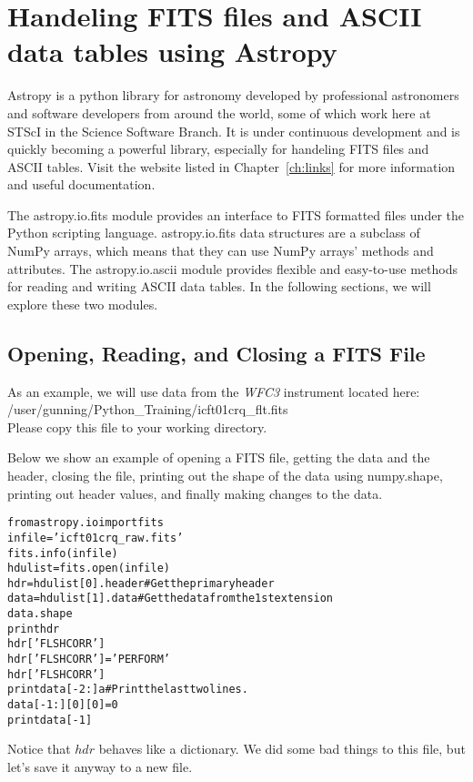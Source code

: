 \chapter{Handeling FITS files and ASCII data tables using Astropy}
\label{ch:fits}
Astropy is a python library for astronomy developed by professional astronomers
and software developers from around the world, some of which work here at STScI
in the Science Software Branch.  It is under continuous development and is quickly
becoming a powerful library, especially for handeling FITS files and ASCII tables.
Visit the website listed in Chapter~\ref{ch:links} for more information and useful
documentation.

The astropy.io.fits module provides an interface to FITS formatted files under the 
Python scripting language.  astropy.io.fits data structures are a subclass of NumPy 
arrays, which means that they can use NumPy arrays' methods and attributes.  The
astropy.io.ascii module provides flexible and easy-to-use methods for reading and 
writing ASCII data tables.  In the following sections, we will explore these two modules.
 
\section{Opening, Reading, and Closing a FITS File}
As an example, we will use data from the \emph{WFC3} instrument located here:  \\
/user/gunning/Python_Training/icft01crq\_flt.fits \\ 
Please copy this file to your working directory. 

Below we show an example of opening a FITS file, getting
the data and the header, closing the file, printing out the shape of
the data using {\sf \small numpy.shape}, printing out header values,
and finally making changes to the data.

\begin{alltt}
\pytab from astropy.io import fits
\pytab infile = 'icft01crq_raw.fits'
\pytab fits.info(infile)
\pytab hdulist = fits.open(infile)
\pytab hdr = hdulist[0].header  # Get the primary header
\pytab data = hdulist[1].data  # Get the data from the 1st extension 
\pytab data.shape
\pytab print hdr 
\pytab hdr['FLSHCORR'] 
\pytab hdr['FLSHCORR'] = 'PERFORM'
\pytab hdr['FLSHCORR']
\pytab print data[-2:]  a# Print the last two lines.
\pytab data[-1:][0][0] = 0
\pytab print data[-1]
\end{alltt}

Notice that $hdr$ behaves like a dictionary.  We did some
bad things to this file, but let's save it anyway to a new file.

